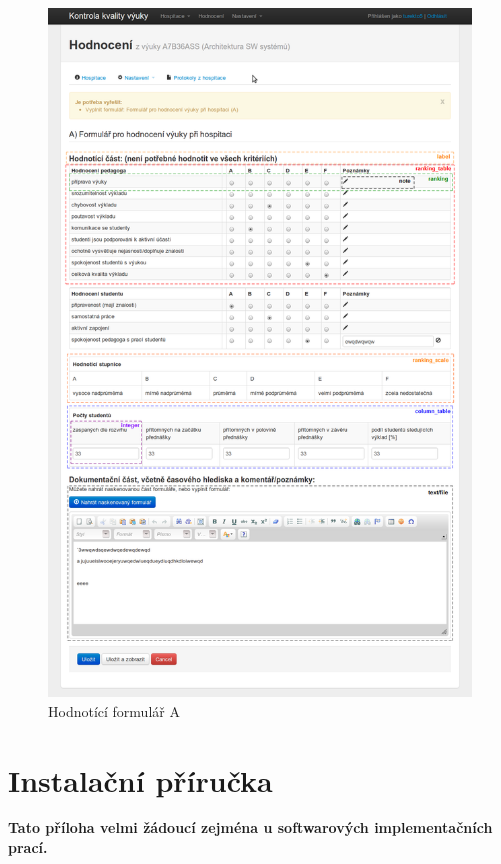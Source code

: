 \begin{figure}[H]
\begin{center}
\includegraphics[width=14cm]{figures/form_A}
\caption{Hodnotící formulář A}
\label{fig:actor_admin}
\end{center}
\end{figure}

\chapter{Instalační příručka}
\textbf{\large Tato příloha velmi žádoucí zejména u softwarových implementačních prací.}

